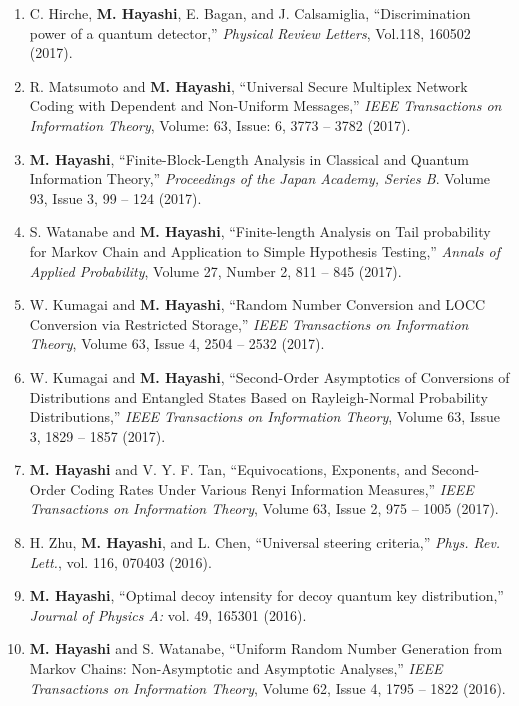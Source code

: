 \documentclass[a4paper,12pt,oneside]{article}
\begin{document}
\begin{enumerate}
\item
C. Hirche, \textbf{M. Hayashi}, E. Bagan, and J. Calsamiglia, 
``Discrimination power of a quantum detector,'' 
{\em Physical Review Letters}, Vol.118, 160502 (2017). 

\item
R. Matsumoto and \textbf{M. Hayashi},  
``Universal Secure Multiplex Network Coding with Dependent and Non-Uniform Messages,'' 
{\em IEEE Transactions on Information Theory}, Volume: 63, Issue: 6, 3773 -- 3782 (2017). 

\item 
\textbf{M. Hayashi}, ``Finite-Block-Length Analysis in Classical and Quantum Information Theory,'' 
{\em Proceedings of the Japan Academy, Series B}.
Volume 93, Issue 3, 99 -- 124 (2017).

\item 
S. Watanabe and \textbf{M. Hayashi}, ``Finite-length Analysis on Tail probability for Markov Chain and Application to Simple Hypothesis Testing,'' 
{\em Annals of Applied Probability},
Volume 27, Number 2, 811 -- 845 (2017).

\item 
W. Kumagai and \textbf{M. Hayashi}, ``Random Number Conversion and LOCC Conversion via Restricted Storage,'' 
{\em IEEE Transactions on Information Theory},
Volume 63, Issue 4, 2504 -- 2532 (2017). 

\item 
W. Kumagai and \textbf{M. Hayashi}, ``Second-Order Asymptotics of Conversions of Distributions and Entangled States Based on Rayleigh-Normal Probability Distributions,'' 
{\em IEEE Transactions on Information Theory}, Volume 63, Issue 3, 1829 -- 1857 (2017). 

\item 
\textbf{M. Hayashi} and V. Y. F. Tan, ``Equivocations, Exponents, and Second-Order Coding Rates Under Various Renyi Information Measures,'' 
{\em IEEE Transactions on Information Theory}, Volume 63, Issue 2, 975 -- 1005 (2017). 

\item 
H. Zhu, \textbf{M. Hayashi}, and L. Chen, ``Universal steering criteria,'' 
{\em Phys. Rev. Lett.}, vol. 116, 070403 (2016). 

\item 
\textbf{M. Hayashi}, 
``Optimal decoy intensity for decoy quantum key distribution,'' 
{\em Journal of Physics A:} vol. 49, 165301 (2016). 

\item 
\textbf{M. Hayashi} and S. Watanabe, ``Uniform Random Number Generation from Markov Chains: Non-Asymptotic and Asymptotic Analyses,'' 
{\em IEEE Transactions on Information Theory}, Volume 62, Issue 4, 1795 -- 1822 (2016). 


\end{enumerate}
\end{document}

